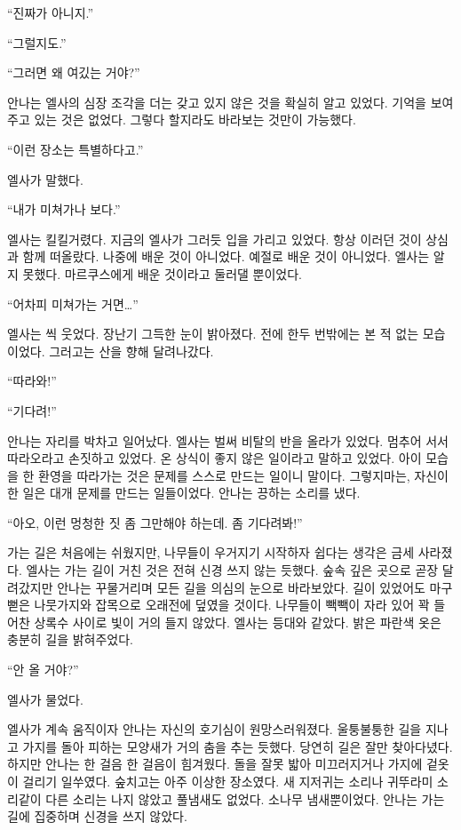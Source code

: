 ``진짜가 아니지.''

``그럴지도.''

``그러면 왜 여깄는 거야?''

안나는 엘사의 심장 조각을 더는 갖고 있지 않은 것을 확실히 알고 있었다. 기억을 보여주고 있는 것은 없었다. 그렇다 할지라도 바라보는 것만이 가능했다.

``이런 장소는 특별하다고.''

엘사가 말했다.

``내가 미쳐가나 보다.''

엘사는 킬킬거렸다. 지금의 엘사가 그러듯 입을 가리고 있었다. 항상 이러던 것이 상심과 함께 떠올랐다. 나중에 배운 것이 아니었다. 예절로 배운 것이 아니었다. 엘사는 알지 못했다. 마르쿠스에게 배운 것이라고 둘러댈 뿐이었다.

``어차피 미쳐가는 거면\ldots''

엘사는 씩 웃었다. 장난기 그득한 눈이 밝아졌다. 전에 한두 번밖에는 본 적 없는 모습이었다. 그러고는 산을 향해 달려나갔다.

``따라와!''

``기다려!''

안나는 자리를 박차고 일어났다. 엘사는 벌써 비탈의 반을 올라가 있었다. 멈추어 서서 따라오라고 손짓하고 있었다. 온 상식이 좋지 않은 일이라고 말하고 있었다. 아이 모습을 한 환영을 따라가는 것은 문제를 스스로 만드는 일이니 말이다. 그렇지마는, 자신이 한 일은 대개 문제를 만드는 일들이었다. 안나는 끙하는 소리를 냈다.

``아오, 이런 멍청한 짓 좀 그만해야 하는데. 좀 기다려봐!''

가는 길은 처음에는 쉬웠지만, 나무들이 우거지기 시작하자 쉽다는 생각은 금세 사라졌다. 엘사는 가는 길이 거친 것은 전혀 신경 쓰지 않는 듯했다. 숲속 깊은 곳으로 곧장 달려갔지만 안나는 꾸물거리며 모든 길을 의심의 눈으로 바라보았다. 길이 있었어도 마구 뻗은 나뭇가지와 잡목으로 오래전에 덮였을 것이다. 나무들이 빽빽이 자라 있어 꽉 들어찬 상록수 사이로 빛이 거의 들지 않았다. 엘사는 등대와 같았다. 밝은 파란색 옷은 충분히 길을 밝혀주었다.

``안 올 거야?''

엘사가 물었다.

엘사가 계속 움직이자 안나는 자신의 호기심이 원망스러워졌다. 울퉁불퉁한 길을 지나고 가지를 돌아 피하는 모양새가 거의 춤을 추는 듯했다. 당연히 길은 잘만 찾아다녔다. 하지만 안나는 한 걸음 한 걸음이 힘겨웠다. 돌을 잘못 밟아 미끄러지거나 가지에 겉옷이 걸리기 일쑤였다. 숲치고는 아주 이상한 장소였다. 새 지저귀는 소리나 귀뚜라미 소리같이 다른 소리는 나지 않았고 풀냄새도 없었다. 소나무 냄새뿐이었다. 안나는 가는 길에 집중하며 신경을 쓰지 않았다.

